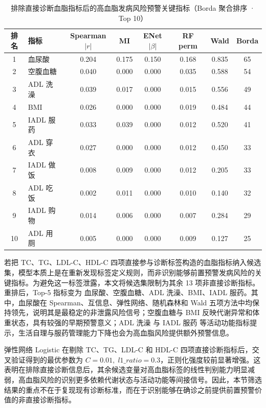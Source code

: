 \documentclass{MathorCupmodeling}
\begin{document}
\begin{table}[H]
\centering\small
\caption{排除直接诊断血脂指标后的高血脂发病风险预警关键指标（Borda 聚合排序 · Top 10）}\label{tab:q1-risk}
\begin{tabular}{@{}c l c c c c c c@{}}
\toprule
排名 & 指标 & Spearman$|r|$ & MI & ENet$|\beta|$ & RF perm & Wald & Borda \\
\midrule
1  & 血尿酸          & 0.204 & 0.175 & 0.150 & 0.168 & 0.835 & 65 \\
2  & 空腹血糖        & 0.040 & 0.000 & 0.000 & 0.035 & 0.588 & 54 \\
3  & ADL 洗澡        & 0.039 & 0.017 & 0.000 & 0.015 & 0.556 & 49 \\
4  & BMI            & 0.026 & 0.000 & 0.000 & 0.019 & 0.484 & 44 \\
5  & IADL 服药      & 0.033 & 0.039 & 0.000 & 0.012 & 0.520 & 41 \\
6  & ADL 穿衣                 & 0.027 & 0.000 & 0.000 & 0.012 & 0.450 & 33 \\
7  & IADL 做饭                & 0.008 & 0.009 & 0.000 & 0.012 & 0.205 & 33 \\
8  & ADL 吃饭                 & 0.002 & 0.011 & 0.000 & 0.010 & 0.140 & 32 \\
9  & IADL 购物                & 0.014 & 0.006 & 0.000 & 0.007 & 0.284 & 29 \\
10 & ADL 用厕                 & 0.005 & 0.000 & 0.000 & 0.009 & 0.127 & 25 \\
\bottomrule
\end{tabular}
\end{table}

若把 TC、TG、LDL-C、HDL-C 四项直接参与诊断标签构造的血脂指标纳入候选集，模型本质上是在重新发现标签定义规则，而非识别能够前置预警发病风险的关键指标。为避免这一标签泄露，本文将候选集限制为其余 13 项非直接诊断指标。重排后，Top-5 指标变为 血尿酸、空腹血糖、ADL 洗澡、BMI、IADL 服药。其中，血尿酸在 Spearman、互信息、弹性网络、随机森林和 Wald 五项方法中均保持领先，说明其是最稳定的非泄露风险信号；空腹血糖与 BMI 反映代谢异常和体重状态，具有较强的早期预警意义；ADL 洗澡 与 IADL 服药 等活动功能指标提示，生活自理与服药管理能力下降也会为高血脂风险提供额外预警信息。

弹性网络 Logistic 在剔除 TC、TG、LDL-C 和 HDL-C 四项直接诊断指标后，交叉验证得到的最优参数为 $C = 0.01,\;l1\_ratio=0.3$，正则化强度较前显著增强。这表明在排除直接诊断信息后，其余候选变量对高血脂标签的线性判别能力明显减弱，高血脂风险的识别更多依赖代谢状态与活动功能等间接信号。因此，本节筛选结果的重点不在于复现现有诊断标准，而在于识别能够在确诊之前提供前置预警价值的非直接诊断指标。
\end{document}
